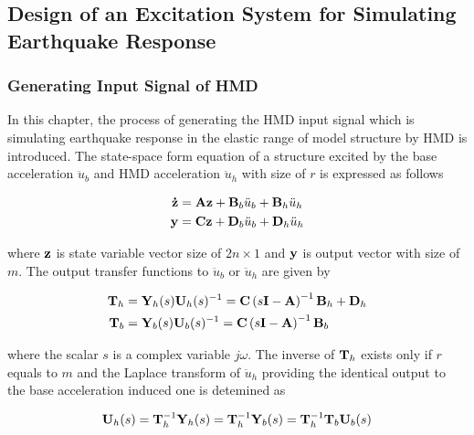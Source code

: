 \subsection{Design of an Excitation System for Simulating Earthquake Response}
\subsubsection{Generating Input Signal of HMD}\label{sec:7-5-1}
In this chapter, the process of generating the HMD input signal which is simulating earthquake response in the elastic range of model structure by HMD is introduced. The state-space form equation of a structure excited by the base acceleration $\ddot{u}_{b}$ and HMD acceleration $\ddot{u}_{h}$ with size of $r$ is expressed as follows

\begin{equation}\label{eq:7-11}
\begin{aligned}
\mathbf{\dot{z}}&= \mathbf{A}\mathbf{z} + \mathbf{B}_{b}\ddot{u}_{b}+\mathbf{B}_{h}\ddot{u}_{h}\\
\mathbf{y}&=\mathbf{C}\mathbf{z}+\mathbf{D}_{b}\ddot{u}_{b}+\mathbf{D}_{h}\ddot{u}_{h}
\end{aligned}
\end{equation}

where $\mathbf{z}$ is state variable vector size of $2n\times1$ and $\mathbf{y}$ is output vector with size of $m$. The output transfer functions to $\ddot{u}_{b}$ or $\ddot{u}_{h}$ are given by

\begin{equation}\label{eq:7-12}
\begin{aligned}
\mathbf{T}_{h}&=\mathbf{Y}_{h}(s)\mathbf{U}_{h}(s)^{-1} = \mathbf{C}\left(s\mathbf{I}-\mathbf{A}\right)^{-1}\mathbf{B}_{h} + \mathbf{D}_{h}\\
\mathbf{T}_{b}&=\mathbf{Y}_{b}(s)\mathbf{U}_{b}(s)^{-1} = \mathbf{C}\left(s\mathbf{I}-\mathbf{A}\right)^{-1}\mathbf{B}_{b}
\end{aligned}
\end{equation}

where the scalar $s$ is a complex variable $j\omega$. The inverse of $\mathbf{T}_{h}$ exists only if $r$ equals to $m$ and the Laplace transform of $\ddot{u}_{h}$ providing the identical output to the base acceleration induced one is detemined as

\begin{equation}\label{eq:7-13}
\mathbf{U}_{h}(s) = \mathbf{T}_{h}^{-1}\mathbf{Y}_{h}(s) = \mathbf{T}_{h}^{-1}\mathbf{Y}_{b}(s) = \mathbf{T}_{h}^{-1}\mathbf{T}_{b}\mathbf{U}_{b}(s)
\end{equation}

